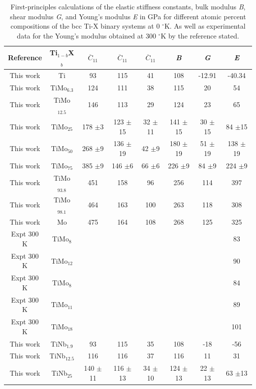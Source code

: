 \newpage
\begin{longtable}[H]{ c c c c c c c c}
	\caption{First-principles calculations of the elastic stiffness constants, bulk modulus \textit{B}, shear modulus \textit{G}, and Young's modulus \textit{E} in GPa for different atomic percent compositions of the bcc Ti-X binary systems at 0 $^\circ$K. As well as experimental data for the Young's modulus obtained at 300 $^\circ$K by the reference stated.} 	\label{Ch5-table:tixelasdata} \\
	\hline
	Reference & Ti$_{1-b}$X$_b$ & $\overline{C}_{11}$ & $\overline{C}_{11}$ & $\overline{C}_{11}$ & \textit{B} & \textit{G} & \textit{E}\\
	\hline
	\endhead
	\hline
	\endfoot
	This work & Ti & 93 & 115 & 41 & 108 & -12.91 & -40.34\\
	This work & TiMo$_{6.3}$ & 124 & 111 & 38 & 115 & 20 & 54\\
	This work & TiMo$_{12.5}$ & 146 & 113 & 29 & 124 & 23 & 65\\
	This work & TiMo$_{25}$ & 178 $\pm$3 & 123 $\pm$15 & 32 $\pm$11 & 141 $\pm$15 & 30 $\pm$15 & 84 $\pm$15\\
	This work & TiMo$_{50}$ & 268 $\pm$9 & 136 $\pm$19 & 42 $\pm$9 & 180 $\pm$19 & 51 $\pm$19 & 138 $\pm$19\\
	This work & TiMo$_{75}$ & 385 $\pm$9 & 146 $\pm$6 & 66 $\pm$6 & 226 $\pm$9 & 84 $\pm$9 & 224 $\pm$9\\
	This work & TiMo$_{93.8}$ & 451 & 158 & 96 & 256 & 114 & 397\\
	This work & TiMo$_{98.1}$ & 464 & 163 & 100 & 263 & 118 & 308\\
	This work & Mo & 475 & 164 & 108 & 268 & 125 & 325\\
	Expt 300 K \cite{Zhang2015} & TiMo$_8$ & & & & & & 83\\
	Expt 300 K \cite{Zhang2015} & TiMo$_{12}$ & & & & & & 90\\
	Expt 300 K \cite{Boyer1994} & TiMo$_{8}$ & & & & & & 84\\
	Expt 300 K \cite{Boyer1994} & TiMo$_{11}$ & & & & & & 89\\
	Expt 300 K \cite{Boyer1994} & TiMo$_{18}$ & & & & & & 101\\
	This work & TiNb$_{1.9}$ & 93 & 115 & 35 & 108 & -18 & -56\\
	This work & TiNb$_{12.5}$ & 116 & 116 & 37 & 116 & 11 & 31\\
	This work & TiNb$_{25}$ & 140 $\pm$11 & 116 $\pm$13 & 34 $\pm$10 & 124 $\pm$13 & 22 $\pm$13 & 63 $\pm$13\\

\end{longtable}
